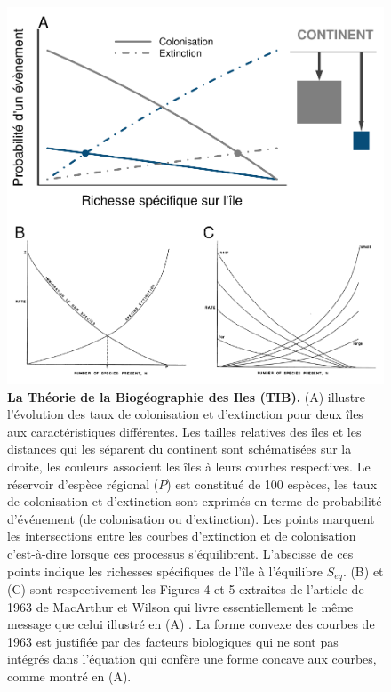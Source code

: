 \begin{figure}[htbp]
\centering
\includegraphics{fig/fig1.pdf}
\caption[La Théorie de la Biogéographie des Iles (TIB).]{\textbf{La Théorie de la Biogéographie des Iles (TIB).} (A) illustre
l'évolution des taux de colonisation et d'extinction pour deux îles aux
caractéristiques différentes. Les tailles relatives des îles et les
distances qui les séparent du continent sont schématisées sur la droite,
les couleurs associent les îles à leurs courbes respectives. Le
réservoir d'espèce régional (\(P\)) est constitué de 100 espèces, les
taux de colonisation et d'extinction sont exprimés en terme de
probabilité d'événement (de colonisation ou d'extinction). Les points
marquent les intersections entre les courbes d'extinction et de
colonisation c'est-à-dire lorsque ces processus s'équilibrent.
L'abscisse de ces points indique les richesses spécifiques de l'île à
l'équilibre \(S_{eq}\). (B) et (C) sont respectivement les Figures 4 et
5 extraites de l'article de 1963 de MacArthur et Wilson qui livre
essentiellement le même message que celui illustré en (A)
\citep{MacArthur1963}. La forme convexe des courbes de 1963 est
justifiée par des facteurs biologiques qui ne sont pas intégrés dans
l'équation \label{eqMW} qui confère une forme concave aux courbes, comme
montré en (A).\label{fig:figMW}}
\end{figure}

